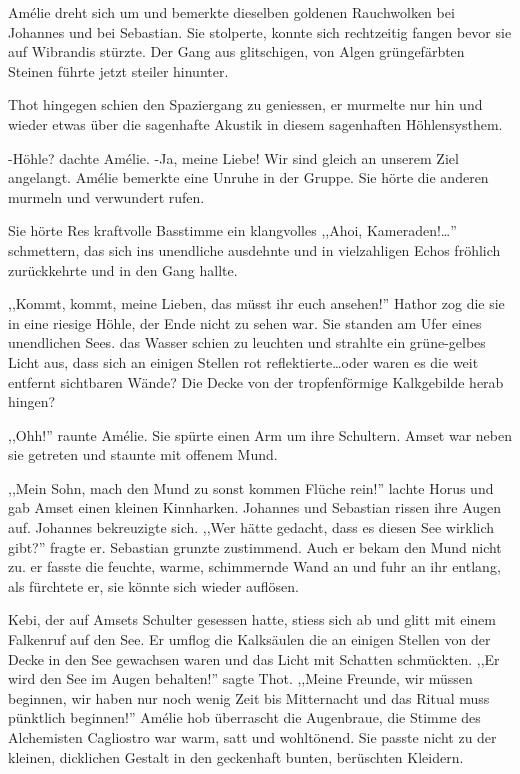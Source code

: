 Amélie dreht sich um und bemerkte dieselben goldenen Rauchwolken bei Johannes und bei Sebastian. Sie stolperte, konnte sich rechtzeitig fangen bevor sie auf Wibrandis stürzte. Der Gang aus glitschigen, von Algen grüngefärbten Steinen führte jetzt steiler hinunter.

Thot hingegen schien den Spaziergang zu geniessen, er murmelte nur hin und wieder etwas über die sagenhafte Akustik in diesem sagenhaften Höhlensysthem. 

-Höhle? dachte Amélie. -Ja, meine Liebe! Wir sind gleich an unserem Ziel angelangt. Amélie bemerkte eine Unruhe in der Gruppe. Sie hörte die anderen murmeln und verwundert rufen.

Sie hörte Res kraftvolle Basstimme ein klangvolles ,,Ahoi, Kameraden!\dots '' schmettern, das sich ins unendliche ausdehnte und in vielzahligen Echos fröhlich zurückkehrte und in den Gang hallte.

,,Kommt, kommt, meine Lieben, das müsst ihr euch ansehen!'' Hathor zog die sie in eine riesige Höhle, der Ende nicht zu sehen war. Sie standen am Ufer eines unendlichen Sees. das Wasser schien zu leuchten und strahlte ein grüne-gelbes Licht aus, dass sich an einigen Stellen rot reflektierte\dots oder waren es die weit entfernt sichtbaren Wände? Die Decke von der tropfenförmige Kalkgebilde herab hingen?

,,Ohh!'' raunte Amélie. Sie spürte einen Arm um ihre Schultern. Amset war neben sie getreten und staunte mit offenem Mund. 

,,Mein Sohn, mach den Mund zu sonst kommen Flüche rein!'' lachte Horus und gab Amset einen kleinen Kinnharken. Johannes und Sebastian rissen ihre Augen auf. Johannes bekreuzigte sich. ,,Wer hätte gedacht, dass es diesen See wirklich gibt?'' fragte er. Sebastian grunzte zustimmend. Auch er bekam den Mund nicht zu. er fasste die feuchte, warme, schimmernde Wand an und fuhr an ihr entlang, als fürchtete er, sie könnte sich wieder auflösen.

Kebi, der auf Amsets Schulter gesessen hatte, stiess sich ab und glitt mit einem Falkenruf auf den See. Er umflog die Kalksäulen die an einigen Stellen von der Decke in den See gewachsen waren und das Licht mit Schatten schmückten. ,,Er wird den See im Augen behalten!'' sagte Thot. 
,,Meine Freunde, wir müssen beginnen, wir haben nur noch wenig Zeit bis Mitternacht und das Ritual muss pünktlich beginnen!'' Amélie hob überrascht die Augenbraue, die Stimme des Alchemisten Cagliostro war warm, satt und wohltönend. Sie passte nicht zu der kleinen, dicklichen Gestalt in den geckenhaft bunten, berüschten Kleidern. 

